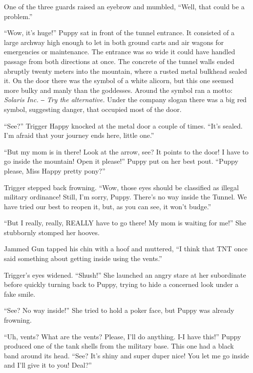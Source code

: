 One of the three guards raised an eyebrow and mumbled, ``Well, that could be a problem.''


\horizonline


``Wow, it's huge!'' Puppy sat in front of the tunnel entrance. It consisted of a large archway high enough to let in both ground carts and air wagons for emergencies or maintenance. The entrance was so wide it could have handled passage from both directions at once. The concrete of the tunnel walls ended abruptly twenty meters into the mountain, where a rusted metal bulkhead sealed it. On the door there was the symbol of a white alicorn, but this one seemed more bulky and manly than the goddesses. Around the symbol ran a motto: \emph{Solaris Inc. ‒ Try the alternative.}\/ Under the company slogan there was a big red symbol, suggesting danger, that occupied most of the door.

``See?'' Trigger Happy knocked at the metal door a couple of times. ``It's sealed. I'm afraid that your journey ends here, little one.''

``But my mom is in there! Look at the arrow, see? It points to the door! I have to go inside the mountain! Open it please!'' Puppy put on her best pout. ``Puppy please, Miss Happy pretty pony?''

Trigger stepped back frowning. ``Wow, those eyes should be classified as illegal military ordinance! Still, I'm sorry, Puppy. There's no way inside the Tunnel. We have tried our best to reopen it, but, as you can see, it won't budge.''

``But I really, really, REALLY have to go there! My mom is waiting for me!'' She stubbornly stomped her hooves.

Jammed Gun tapped his chin with a hoof and muttered, ``I think that TNT once said something about getting inside using the vents.''

Trigger's eyes widened. ``Shush!'' She launched an angry stare at her subordinate before quickly turning back to Puppy, trying to hide a concerned look under a fake smile.

``See? No way inside!'' She tried to hold a poker face, but Puppy was already frowning.

``Uh, vents? What are the vents? Please, I'll do anything. I-I have this!'' Puppy produced one of the tank shells from the military base. This one had a black band around its head. ``See? It's shiny and super duper nice! You let me go inside and I'll give it to you! Deal?''

